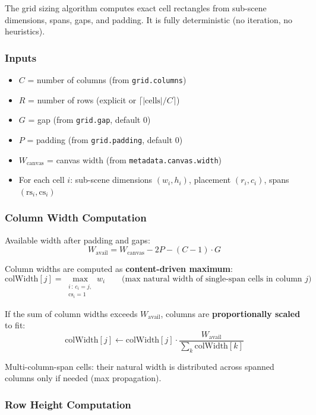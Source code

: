 The grid sizing algorithm computes exact cell rectangles from sub-scene dimensions, spans, gaps, and padding.  It is fully deterministic (no iteration, no heuristics).

\subsubsection{Inputs}

\begin{itemize}
  \item $C$ = number of columns (from \texttt{grid.columns})
  \item $R$ = number of rows (explicit or $\lceil |\text{cells}| / C \rceil$)
  \item $G$ = gap (from \texttt{grid.gap}, default 0)
  \item $P$ = padding (from \texttt{grid.padding}, default 0)
  \item $W_{\text{canvas}}$ = canvas width (from \texttt{metadata.canvas.width})
  \item For each cell $i$: sub-scene dimensions $(w_i, h_i)$, placement $(r_i, c_i)$, spans $(\text{rs}_i, \text{cs}_i)$
\end{itemize}

\subsubsection{Column Width Computation}

Available width after padding and gaps:
\[
  W_{\text{avail}} = W_{\text{canvas}} - 2P - (C-1) \cdot G
\]

Column widths are computed as \textbf{content-driven maximum}:
\[
  \text{colWidth}[j] = \max_{\substack{i \,:\, c_i = j,\\ \text{cs}_i = 1}} w_i
  \qquad \text{(max natural width of single-span cells in column } j\text{)}
\]

If the sum of column widths exceeds $W_{\text{avail}}$, columns are \textbf{proportionally scaled} to fit:
\[
  \text{colWidth}[j] \leftarrow \text{colWidth}[j] \cdot \frac{W_{\text{avail}}}{\sum_k \text{colWidth}[k]}
\]

Multi-column-span cells: their natural width is distributed across spanned columns only if needed (max propagation).

\subsubsection{Row Height Computation}

